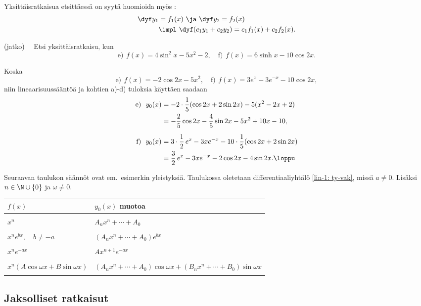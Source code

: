 Yksittäisratkaisua etsittäessä on syytä huomioida myös :
\begin{align*}
\dyf y_1 &= f_1(x) \ \ja \ \dyf y_2=f_2(x) \\
&\impl \ \dyf(c_1y_1+c_2y_2)=c_1f_1(x)+c_2f_2(x).
\end{align*}
\jatko \begin{Exa}
(jatko) \ \, Etsi yksittäisratkaisu, kun
\[
\text{e)}\,\ f(x)=4\sin^2 x-5x^2-2, \quad
\text{f)}\,\ f(x)=6\sinh x-10\cos 2x.
\]
\end{Exa}
\ratk Koska
\[
\text{e)}\,\ f(x)=-2\cos 2x-5x^2, \quad
\text{f)}\,\ f(x)=3e^x-3e^{-x}-10\cos 2x,
\]
niin lineaarisuussääntöä ja kohtien a)-d) tuloksia käyttäen saadaan
\begin{align*}
\text{e)}\ \ y_0(x) &= -2\cdot\frac{1}{5}(\cos 2x+2\sin 2x)-5(x^2-2x+2) \\
                    &= -\frac{2}{5}\cos 2x-\frac{4}{5}\sin 2x-5x^2+10x-10, \\[2mm]
\text{f)}\ \ y_0(x) &= 3\cdot\frac{1}{2}\,e^x-3xe^{-x}-10\cdot\frac{1}{5}(\cos 2x+2\sin 2x) \\
             &= \frac{3}{2}\,e^x-3xe^{-x}-2\cos 2x-4\sin 2x. \loppu
\end{align*}

Seuraavan taulukon säännöt ovat em.\ esimerkin yleistyksiä. Taulukossa oletetaan
differentiaaliyhtälö \eqref{lin-1: ty-vak}, missä
$a\neq 0$. Lisäksi $n\in\N\cup\{0\}$ ja $\omega\neq 0$.
\vspace{0.5cm} \newline
\begin{tabular}{|l|l|} \hline
$f(x)$ &$y_0(x)$ muotoa \\ \hline & \\
$x^n$ &$A_nx^n+\cdots + A_0$ \\ & \\
$x^ne^{bx}, \quad b\neq-a$ &$(A_nx^n+\cdots + A_0)e^{bx}$ \\ & \\
$x^ne^{-ax}$ &$Ax^{n+1}e^{-ax}$ \\ & \\
$x^n(A\cos \omega x + B\sin \omega x)$ &$(A_nx^n+\cdots + A_0)\cos \omega x 
                                                   + (B_nx^n+\cdots + B_0)\sin \omega x$ \\ 
& \\ \hline 
\end{tabular}

\subsection{Jaksolliset ratkaisut}

